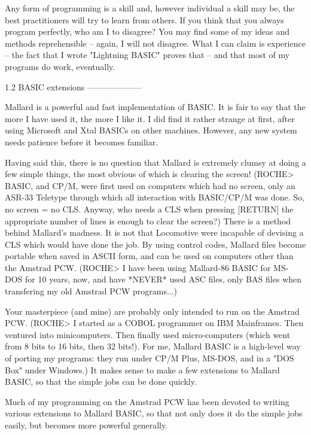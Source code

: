 Any form of programming is a skill and, however individual a skill may be, the 
best practitioners will try to learn from others. If you think that you always 
program  perfectly,  who am I to disagree? You may find some of my  ideas  and 
methods  reprehensible  --  again, I will not disagree. What I  can  claim  is 
experience -- the fact that I wrote "Lightning BASIC" proves that -- and  that 
most of my programs do work, eventually.


1.2 BASIC extensions
--------------------

Mallard is a powerful and fast implementation of BASIC. It is fair to say that 
the  more I have used it, the more I like it. I did find it rather strange  at 
first,  after using Microsoft and Xtal BASICs on other machines. However,  any 
new system needs patience before it becomes familiar.

Having  said  this, there is no question that Mallard is extremely  clumsy  at 
doing  a few simple things, the most obvious of which is clearing the  screen! 
(ROCHE>  BASIC,  and CP/M, were first used on computers which had  no  screen, 
only  an  ASR-33 Teletype through which all interaction  with  BASIC/CP/M  was 
done.  So, no screen = no CLS. Anyway, who needs a CLS when pressing  [RETURN] 
the  appropriate  number of lines is enough to clear the screen?) There  is  a 
method  behind Mallard's madness. It is not that Locomotive were incapable  of 
devising a CLS which would have done the job. By using control codes,  Mallard 
files  become portable when saved in ASCII form, and can be used on  computers 
other than the Amstrad PCW. (ROCHE> I have been using Mallard-86 BASIC for MS-
DOS  for 10 years, now, and have *NEVER* used ASC files, only BAS  files  when 
transfering my old Amstrad PCW programs...)

Your  masterpiece (and mine) are probably only intended to run on the  Amstrad 
PCW. (ROCHE> I started as a COBOL programmer on IBM Mainframes. Then  ventured 
into minicomputers. Then finally used micro-computers (which went from 8  bits 
to  16  bits,  then 32 bits!). For me, Mallard BASIC is a  high-level  way  of 
porting  my  programs: they run under CP/M Plus, MS-DOS, and in  a  "DOS  Box" 
under  Windows.) It makes sense to make a few extensions to Mallard BASIC,  so 
that the simple jobs can be done quickly.

Much of my programming on the Amstrad PCW has been devoted to writing  various 
extensions  to  Mallard  BASIC, so that not only does it do  the  simple  jobs 
easily, but becomes more powerful generally.

